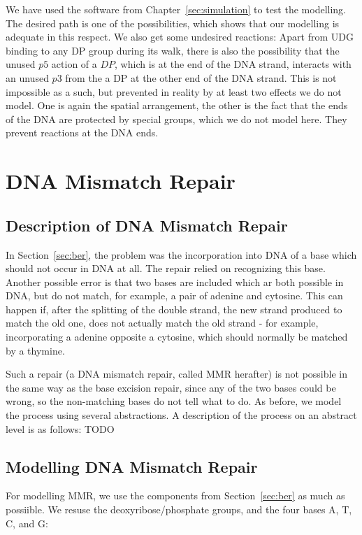\documentclass[review]{elsarticle}
\begin{document}
We have used the software from Chapter~\ref{sec:simulation} to test the modelling. The desired path is one of the possibilities, which shows that our modelling is adequate in this respect. We also get some undesired reactions: Apart from UDG binding to any DP group during its walk, there is also the possibility that the unused $p5$ action of a $DP$, which is at the end of the DNA strand, interacts with an unused $p3$ from the a DP at the other end of the DNA strand. This is not impossible as a such, but prevented in reality by at least two effects we do not model. One is again the spatial arrangement, the other is the fact that the ends of the DNA are protected by special groups, which we do not model here. They prevent reactions at the DNA ends.

\section{DNA Mismatch Repair}
\label{sec:dnamimatch}

\subsection{Description of DNA Mismatch Repair}

In Section~\ref{sec:ber}, the problem was the incorporation into DNA of a base which should not occur in DNA at all. The repair relied on recognizing this base. Another possible error is that two bases are included which ar both possible in DNA, but do not match, for example, a pair of adenine and cytosine. This can happen if, after the splitting of the double strand, the new strand produced to match the old one, does not actually match the old strand - for example, incorporating a adenine opposite a cytosine, which should normally be matched by a thymine.

Such a repair (a DNA mismatch repair, called MMR herafter) is not possible in the same way as the base excision repair, since any of the two bases could be wrong, so the non-matching  bases do not tell what to do.  As before, we model the process using several abstractions. A description of the process on an abstract level is as follows: TODO

\subsection{Modelling DNA Mismatch Repair}

For modelling MMR, we use the components from Section~\ref{sec:ber} as much as possiible. We resuse the deoxyribose/phosphate groups, and the four bases A, T, C, and G:
\end{document}

